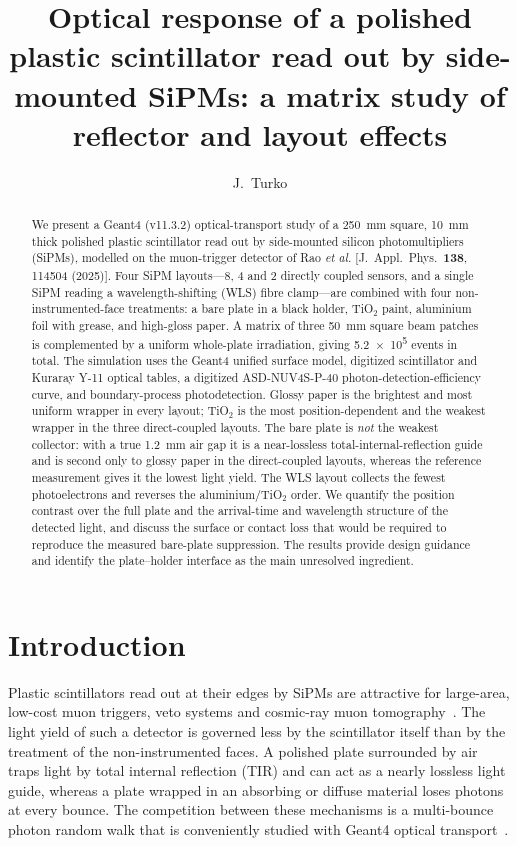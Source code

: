 \documentclass[preprint,12pt]{elsarticle}
\author{J.~Turko}
\title{Optical response of a polished plastic scintillator read out by
side-mounted SiPMs: a \gfour{} matrix study of reflector and layout effects}
\newcommand{\gfour}{Geant4}
\begin{document}
\begin{frontmatter}

\begin{abstract}
We present a \gfour{} (v11.3.2) optical-transport study of a
\SI{250}{\milli\meter} square, \SI{10}{\milli\meter} thick polished plastic
scintillator read out by side-mounted silicon photomultipliers (SiPMs), modelled
on the muon-trigger detector of Rao \emph{et al.}
[J.~Appl.\ Phys.\ \textbf{138}, 114504 (2025)]. Four SiPM layouts---8, 4 and 2
directly coupled sensors, and a single SiPM reading a wavelength-shifting (WLS)
fibre clamp---are combined with four non-instrumented-face treatments: a bare
plate in a black holder, TiO$_2$ paint, aluminium foil with grease, and
high-gloss paper. A matrix of three \SI{50}{\milli\meter} square beam patches is
complemented by a uniform whole-plate irradiation, giving
\num{5.2e5} events in total. The simulation uses the \gfour{} unified surface
model, digitized scintillator and Kuraray Y-11 optical tables, a digitized
ASD-NUV4S-P-40 photon-detection-efficiency curve, and boundary-process
photodetection. Glossy paper is the brightest and most uniform wrapper in every
layout; TiO$_2$ is the most position-dependent and the weakest wrapper in the
three direct-coupled layouts. The bare plate is \emph{not} the weakest
collector: with a true \SI{1.2}{\milli\meter} air gap it is a near-lossless
total-internal-reflection guide and is second only to glossy paper in the
direct-coupled layouts, whereas the reference measurement gives it the lowest
light yield. The WLS layout collects the fewest photoelectrons and reverses the
aluminium/TiO$_2$ order. We quantify the position contrast over the full plate
and the arrival-time and wavelength structure of the detected light, and
discuss the surface or contact loss that would be required to reproduce the measured
bare-plate suppression. The results provide design guidance and
identify the plate--holder interface as the main unresolved ingredient.
\end{abstract}

\end{frontmatter}

\section{Introduction}
\label{sec:intro}

Plastic scintillators read out at their edges by SiPMs are attractive for
large-area, low-cost muon triggers, veto systems and cosmic-ray muon
tomography~\cite{Borozdin2003,Bonechi2020}. The light yield of such a detector
is governed less by the scintillator itself than by the treatment of the
non-instrumented faces. A polished plate surrounded by air traps light by total
internal reflection (TIR) and can act as a nearly lossless light guide, whereas
a plate wrapped in an absorbing or diffuse material loses photons at every
bounce. The competition between these mechanisms is a multi-bounce photon
random walk that is conveniently studied with \gfour{} optical
transport~\cite{Agostinelli2003,Allison2016,Korpachev2017}.
\end{document}
